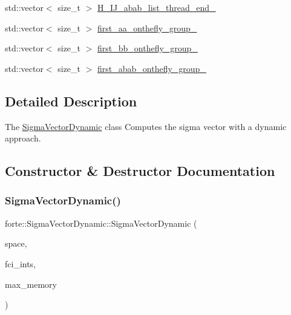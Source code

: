 \begin{DoxyCompactItemize}
\item 
std\+::vector$<$ size\+\_\+t $>$ \mbox{\hyperlink{classforte_1_1_sigma_vector_dynamic_a34afa4286e7513c24761864e8e217965}{H\+\_\+\+I\+J\+\_\+abab\+\_\+list\+\_\+thread\+\_\+end\+\_\+}}
\item 
std\+::vector$<$ size\+\_\+t $>$ \mbox{\hyperlink{classforte_1_1_sigma_vector_dynamic_ac0d7f55f2fbefc773a687908e2d62e81}{first\+\_\+aa\+\_\+onthefly\+\_\+group\+\_\+}}
\item 
std\+::vector$<$ size\+\_\+t $>$ \mbox{\hyperlink{classforte_1_1_sigma_vector_dynamic_ab9f4bb6250341b137547c5db79729d14}{first\+\_\+bb\+\_\+onthefly\+\_\+group\+\_\+}}
\item 
std\+::vector$<$ size\+\_\+t $>$ \mbox{\hyperlink{classforte_1_1_sigma_vector_dynamic_aed969a03bee0b29cf3fbf13c28d5e026}{first\+\_\+abab\+\_\+onthefly\+\_\+group\+\_\+}}
\end{DoxyCompactItemize}


\subsection{Detailed Description}
The \mbox{\hyperlink{classforte_1_1_sigma_vector_dynamic}{Sigma\+Vector\+Dynamic}} class Computes the sigma vector with a dynamic approach. 

\subsection{Constructor \& Destructor Documentation}
\mbox{\label{classforte_1_1_sigma_vector_dynamic_ac2fe877e6af7cb012659e616cfc3cbb0}} 
\subsubsection{\texorpdfstring{Sigma\+Vector\+Dynamic()}{SigmaVectorDynamic()}}
{\footnotesize\ttfamily forte\+::\+Sigma\+Vector\+Dynamic\+::\+Sigma\+Vector\+Dynamic (\begin{DoxyParamCaption}\item[{const \mbox{\hyperlink{classforte_1_1_determinant_hash_vec}{Determinant\+Hash\+Vec}} \&}]{space,  }\item[{std\+::shared\+\_\+ptr$<$ \mbox{\hyperlink{classforte_1_1_active_space_integrals}{Active\+Space\+Integrals}} $>$}]{fci\+\_\+ints,  }\item[{size\+\_\+t}]{max\+\_\+memory }\end{DoxyParamCaption})}

